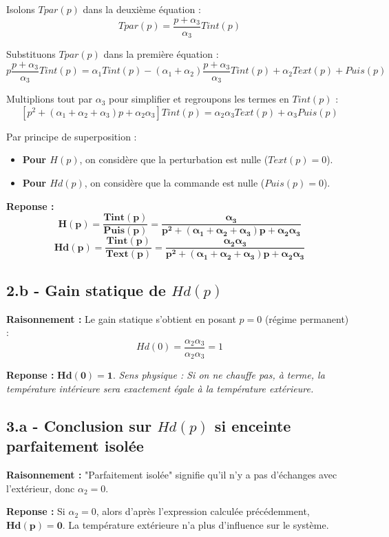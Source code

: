 \documentclass[11pt,a4paper]{article}
\begin{document}
Isolons $Tpar(p)$ dans la deuxième équation :
$$ Tpar(p) = \frac{p + \alpha_3}{\alpha_3} Tint(p) $$

Substituons $Tpar(p)$ dans la première équation :
$$ p \frac{p + \alpha_3}{\alpha_3} Tint(p) = \alpha_1 Tint(p) - (\alpha_1 + \alpha_2) \frac{p + \alpha_3}{\alpha_3} Tint(p) + \alpha_2 Text(p) + Puis(p) $$

Multiplions tout par $\alpha_3$ pour simplifier et regroupons les termes en $Tint(p)$ :
$$ [p^2 + (\alpha_1 + \alpha_2 + \alpha_3)p + \alpha_2 \alpha_3] Tint(p) = \alpha_2 \alpha_3 Text(p) + \alpha_3 Puis(p) $$

Par principe de superposition :
\begin{itemize}
    \item \textbf{Pour $H(p)$}, on considère que la perturbation est nulle ($Text(p) = 0$).
    \item \textbf{Pour $Hd(p)$}, on considère que la commande est nulle ($Puis(p) = 0$).
\end{itemize}

\textbf{Reponse :}
$$ 
\mathbf{H(p) = \frac{Tint(p)}{Puis(p)} = \frac{\alpha_3}{p^2 + (\alpha_1 + \alpha_2 + \alpha_3)p + \alpha_2 \alpha_3}} 
$$
$$ 
\mathbf{Hd(p) = \frac{Tint(p)}{Text(p)} = \frac{\alpha_2 \alpha_3}{p^2 + (\alpha_1 + \alpha_2 + \alpha_3)p + \alpha_2 \alpha_3}} 
$$

\subsection*{2.b - Gain statique de $Hd(p)$}

\textbf{Raisonnement :} Le gain statique s'obtient en posant $p = 0$ (régime permanent) :
$$ Hd(0) = \frac{\alpha_2 \alpha_3}{\alpha_2 \alpha_3} = 1 $$

\textbf{Reponse :} $\mathbf{Hd(0) = 1}$.
\textit{Sens physique : Si on ne chauffe pas, à terme, la température intérieure sera exactement égale à la température extérieure.}

\subsection*{3.a - Conclusion sur $Hd(p)$ si enceinte parfaitement isolée}

\textbf{Raisonnement :} "Parfaitement isolée" signifie qu'il n'y a pas d'échanges avec l'extérieur, donc $\alpha_2 = 0$.

\textbf{Reponse :} Si $\alpha_2 = 0$, alors d'après l'expression calculée précédemment, $\mathbf{Hd(p) = 0}$. La température extérieure n'a plus d'influence sur le système.
\end{document}
